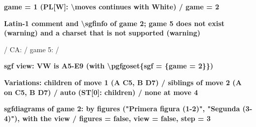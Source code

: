 \documentclass{article}
\newcommand\case[1]{\par\medskip\noindent\textbf{#1}\par\nopagebreak}
\begin{document}

\case{game = 1 (PL[W]: \textbackslash moves continues with White) / game = 2}
\begin{goban}[5]\end{goban}
\begin{goban}[9]\end{goban}

\case{Latin-1 comment and \textbackslash sgfinfo of game 2; game 5 does not exist (warning) and a charset that is not supported (warning)}
 / CA:  /
game 5:  / 

\case{sgf view: VW is A5-E9 (with \textbackslash pgfgoset\{sgf = \{game = 2\}\})}
{%
\begin{goban}[sgf view = collection.sgf, label = {at = {north, west}}]\end{goban}}

\case{Variations: children of move 1 (A C5, B D7) / siblings of move 2 (A on C5, B D7) / auto (ST[0]: children) / none at move 4}
\begin{goban}[9]\end{goban}
\begin{goban}[9]\end{goban}
\begin{goban}[9]\end{goban}
\begin{goban}[9]\end{goban}

\case{sgfdiagrams of game 2: by figures ("Primera figura (1-2)", "Segunda (3-4)"), with the view / figures = false, view = false, step = 3}

\end{document}
